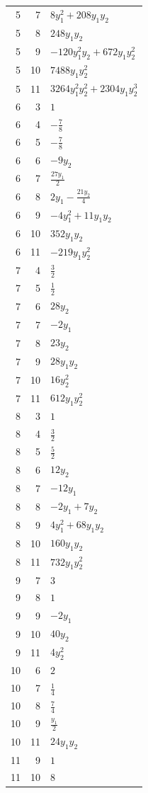 \documentclass[10pt,a4paper]{article}
\begin{document}
{\begin{longtable}{rrp{125mm}}
5 & 7 & $8 y_{1}^{2} + 208 y_{1} y_{2}$\\
5 & 8 & $248 y_{1} y_{2}$\\
5 & 9 & $- 120 y_{1}^{2} y_{2} + 672 y_{1} y_{2}^{2}$\\
5 & 10 & $7488 y_{1} y_{2}^{2}$\\
5 & 11 & $3264 y_{1}^{2} y_{2}^{2} + 2304 y_{1} y_{2}^{3}$\\
6 & 3 & $1$\\
6 & 4 & $- \frac{7}{8}$\\
6 & 5 & $- \frac{7}{8}$\\
6 & 6 & $- 9 y_{2}$\\
6 & 7 & $\frac{27 y_{1}}{2}$\\
6 & 8 & $2 y_{1} - \frac{21 y_{2}}{4}$\\
6 & 9 & $- 4 y_{1}^{2} + 11 y_{1} y_{2}$\\
6 & 10 & $352 y_{1} y_{2}$\\
6 & 11 & $- 219 y_{1} y_{2}^{2}$\\
7 & 4 & $\frac{3}{2}$\\
7 & 5 & $\frac{1}{2}$\\
7 & 6 & $28 y_{2}$\\
7 & 7 & $- 2 y_{1}$\\
7 & 8 & $23 y_{2}$\\
7 & 9 & $28 y_{1} y_{2}$\\
7 & 10 & $16 y_{2}^{2}$\\
7 & 11 & $612 y_{1} y_{2}^{2}$\\
8 & 3 & $1$\\
8 & 4 & $\frac{3}{2}$\\
8 & 5 & $\frac{5}{2}$\\
8 & 6 & $12 y_{2}$\\
8 & 7 & $- 12 y_{1}$\\
8 & 8 & $- 2 y_{1} + 7 y_{2}$\\
8 & 9 & $4 y_{1}^{2} + 68 y_{1} y_{2}$\\
8 & 10 & $160 y_{1} y_{2}$\\
8 & 11 & $732 y_{1} y_{2}^{2}$\\
9 & 7 & $3$\\
9 & 8 & $1$\\
9 & 9 & $- 2 y_{1}$\\
9 & 10 & $40 y_{2}$\\
9 & 11 & $4 y_{2}^{2}$\\
10 & 6 & $2$\\
10 & 7 & $\frac{1}{4}$\\
10 & 8 & $\frac{7}{4}$\\
10 & 9 & $\frac{y_{1}}{2}$\\
10 & 11 & $24 y_{1} y_{2}$\\
11 & 9 & $1$\\
11 & 10 & $8$\\
\end{longtable}}
\end{document}
